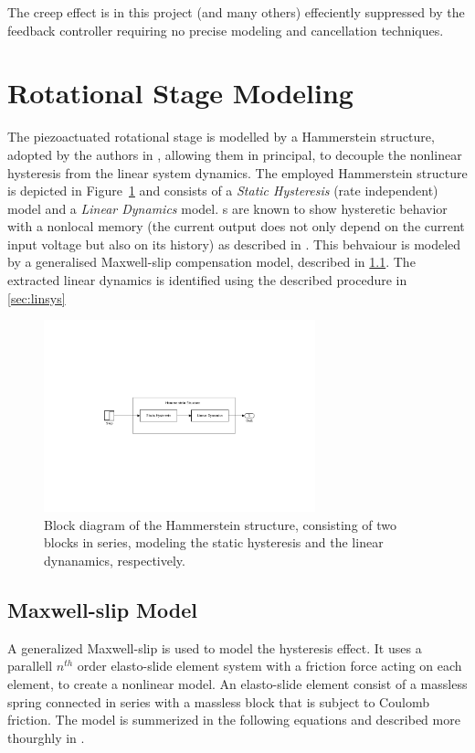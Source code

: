 The creep effect is in this project (and many others) effeciently suppressed by the feedback controller requiring no precise modeling and cancellation techniques.

\section{Rotational Stage Modeling}
The piezoactuated rotational stage is modelled by a Hammerstein structure, adopted by the authors in \cite{ButcherController:2015}, allowing them in principal, to decouple the nonlinear hysteresis from the linear system dynamics. The employed Hammerstein structure is depicted in Figure~\ref{fig:hammerstein} and consists of a \emph{Static Hysteresis} (rate independent) model and a \emph{Linear Dynamics} model. {\abbrPEA}s are known to show hysteretic behavior with a nonlocal memory (the current output does not only depend on the current input voltage but also on its history) as described in \cite{ButcherIdentification:2015}. This behvaiour is modeled by a generalised Maxwell-slip compensation model, described in \ref{sec:maxwell}. The extracted linear dynamics is identified using the described procedure in \ref{sec:linsys}

\begin{figure}[h]
  \centering %
  \includegraphics[width=0.7\textwidth, trim=8cm 8cm 7.73cm 8cm, clip=true]{fig/matlab/hammerstein}
  \caption{\label{fig:hammerstein}Block diagram of the Hammerstein structure, consisting of two blocks in series, modeling the static hysteresis and the linear dynanamics, respectively.}
\end{figure}

\subsection{Maxwell-slip Model}
\label{sec:maxwell}
A generalized Maxwell-slip is used to model the hysteresis effect. It uses a parallell $n^{th}$ order elasto-slide element system with a friction force acting on each element, to create a nonlinear model. An elasto-slide element consist of a massless spring connected in series with a massless block that is subject to Coulomb friction. The model is summerized in the following equations and described more thourghly in \citep{Ru:2016}.

